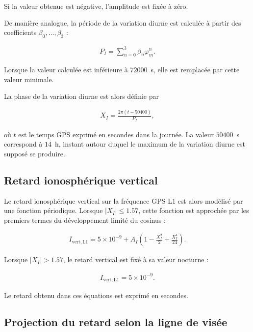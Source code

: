 Si la valeur obtenue est négative, l'amplitude est fixée à zéro.

De manière analogue, la période de la variation diurne est calculée à partir
des coefficients $\beta_0,\ldots,\beta_3$ :

\begin{align}
P_I
=
\sum_{n=0}^{3}\beta_n\varphi_m^n.
\label{eq:klobuchar_period}
\end{align}

Lorsque la valeur calculée est inférieure à $72000$~s, elle est remplacée
par cette valeur minimale.

La phase de la variation diurne est alors définie par

\begin{align}
X_I
=
\frac{2\pi(t-50400)}
{P_I},
\label{eq:klobuchar_phase}
\end{align}

où $t$ est le temps GPS exprimé en secondes dans la journée. La valeur
$50400$~s correspond à $14$~h, instant autour duquel le maximum de la
variation diurne est supposé se produire.

\subsection{Retard ionosphérique vertical}

Le retard ionosphérique vertical sur la fréquence GPS L1 est alors modélisé
par une fonction périodique. Lorsque $|X_I|\leq 1.57$, cette fonction est
approchée par les premiers termes du développement limité du cosinus :

\begin{align}
I_{\mathrm{vert,L1}}
=
5\times10^{-9}
+
A_I
\left(
1-\frac{X_I^2}{2}
+\frac{X_I^4}{24}
\right).
\label{eq:klobuchar_vertical}
\end{align}

Lorsque $|X_I|>1.57$, le retard vertical est fixé à sa valeur nocturne :

\begin{align}
I_{\mathrm{vert,L1}}
=
5\times10^{-9}.
\label{eq:klobuchar_night}
\end{align}

Le retard obtenu dans ces équations est exprimé en secondes.

\subsection{Projection du retard selon la ligne de visée}

